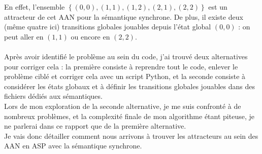 \documentclass[12pt,a4paper]{article}
\begin{document}
\begin{center}
\end{center}
En effet, l'ensemble $\left\{(0,0),(1,1),(1,2),(2,1),(2,2)\right\}$ est un attracteur de cet AAN pour la sémantique synchrone. De plus, il existe deux (même quatre ici) transitions globales jouables depuis l'état global $(0,0)$ : 
on peut aller en $(1,1)$ ou encore en $(2,2)$.\\ \\
Après avoir identifié le problème au sein du code, j'ai trouvé deux alternatives pour corriger cela : la première consiste à reprendre tout le code, enlever le problème ciblé et corriger cela avec un script Python, et la seconde 
consiste à considérer les états globaux et à définir les transitions globales jouables dans des fichiers dédiés aux sémantiques.\\
 Lors de mon exploration de la seconde alternative, je me suis confronté à de nombreux problèmes, et la complexité finale de mon algorithme étant piteuse, je ne parlerai dans ce rapport que de la première alternative.\\
Je vais donc détailler comment nous arrivons à trouver les attracteurs au sein des AAN en ASP avec la sémantique synchrone.
\end{document}
